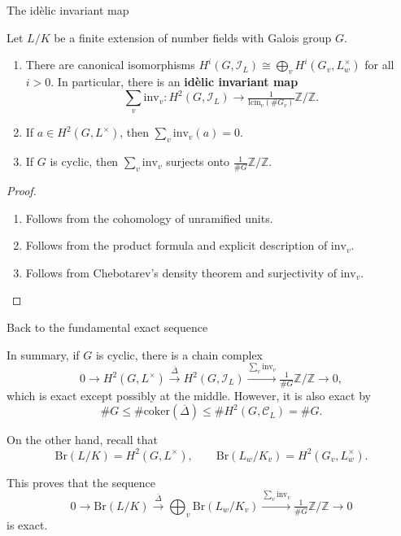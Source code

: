 \documentclass[10pt]{beamer}
\begin{document}
\begin{frame}[t]{The id\`elic invariant map}

\begin{corollary}
Let $ L / K $ be a finite extension of number fields with Galois group $ G $.

\pause

\begin{enumerate}
\item There are canonical isomorphisms $ H^i(G, \mathcal{I}_L) \cong \bigoplus_v H^i(G_v, L_w^\times) $ for all $ i > 0 $. In particular, there is an \textbf{id\`elic invariant map}
$$ \sum_v \mathrm{inv}_v : H^2(G, \mathcal{I}_L) \to \tfrac{1}{\mathrm{lcm}_v(\#G_v)}\mathbb{Z} / \mathbb{Z}. $$

\pause

\item If $ a \in H^2(G, L^\times) $, then $ \sum_v \mathrm{inv}_v(a) = 0 $.

\pause

\item If $ G $ is cyclic, then $ \sum_v \mathrm{inv}_v $ surjects onto $ \tfrac{1}{\#G}\mathbb{Z} / \mathbb{Z} $.
\end{enumerate}
\end{corollary}

\pause

\begin{proof}
\begin{enumerate}
\item Follows from the cohomology of unramified units.
\item Follows from the product formula and explicit description of $ \mathrm{inv}_v $.
\item Follows from Chebotarev's density theorem and surjectivity of $ \mathrm{inv}_v $.
\end{enumerate}
\end{proof}

\end{frame}

\begin{frame}[t]{Back to the fundamental exact sequence}

In summary, if $ G $ is cyclic, there is a chain complex
$$ 0 \to H^2(G, L^\times) \xrightarrow{\overline{\Delta}} H^2(G, \mathcal{I}_L) \xrightarrow{\sum_v \mathrm{inv}_v} \tfrac{1}{\#G}\mathbb{Z} / \mathbb{Z} \to 0, $$
which is exact except possibly at the middle. \pause However, it is also exact by
$$ \#G \le \#\mathrm{coker}(\overline{\Delta}) \le \#H^2(G, \mathcal{C}_L) = \#G. $$

\pause

On the other hand, recall that
$$ \mathrm{Br}(L / K) = H^2(G, L^\times), \qquad \mathrm{Br}(L_w / K_v) = H^2(G_v, L_w^\times). $$

\pause

This proves that the sequence
$$ 0 \to \mathrm{Br}(L / K) \xrightarrow{\overline{\Delta}} \bigoplus_v \mathrm{Br}(L_w / K_v) \xrightarrow{\sum_v \mathrm{inv}_v} \tfrac{1}{\#G}\mathbb{Z} / \mathbb{Z} \to 0 $$
is exact.

\end{frame}
\end{document}
